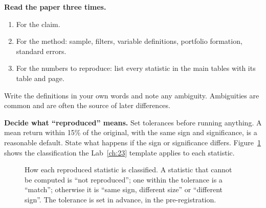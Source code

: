 \textbf{Read the paper three times.}

\begin{enumerate}
  \item For the claim.
  \item For the method: sample, filters, variable definitions, portfolio formation, standard errors.
  \item For the numbers to reproduce: list every statistic in the main tables with its table and page.
\end{enumerate}

Write the definitions in your own words and note any ambiguity. Ambiguities are common and are often the source of later differences.

\textbf{Decide what ``reproduced'' means.} Set tolerances before running anything. A mean return within 15\% of the original, with the same sign and significance, is a reasonable default. State what happens if the sign or significance differs. Figure~\ref{fig:23-status} shows the classification the Lab~\ref{ch:23} template applies to each statistic.

\begin{figure}[htbp]
\centering
{}
\caption{How each reproduced statistic is classified. A statistic that cannot be computed is ``not reproduced''; one within the tolerance is a ``match''; otherwise it is ``same sign, different size'' or ``different sign''. The tolerance is set in advance, in the pre-registration.}
\label{fig:23-status}
\end{figure}

